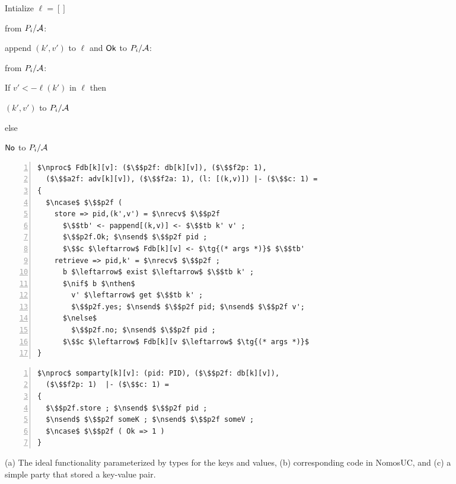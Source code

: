 \begin{figure}
\centering
\begin{minipage}{0.38\textwidth}
\begin{bbox}[title={Functionality $\F_{\m{db}}$}]

Intialize $\ell = []$

\OnInput {} from $P_i/\mathcal{A}$:

\qquad append $(k',v')$ to $\ell$ and \Send $\mathsf{Ok}$ to $P_i/\mathcal{A}$:

\OnInput {} from $P_i/\mathcal{A}$:

\qquad If $v' <- \ell(k')$ in $\ell$ then

\qquad \qquad \Send $(k', v')$ to $P_i/\mathcal{A}$

\qquad else

\qquad \qquad \Send $\mathsf{No}$ to $P_i/\mathcal{A}$
\end{bbox}
\end{minipage}
\hspace{3em}
\begin{minipage}{0.5\textwidth}
\begin{lstlisting}[basicstyle=\scriptsize\BeraMonottFamily, frame=single, mathescape, numbers=left, xleftmargin=2em, xrightmargin=2em]
$\nproc$ Fdb[k][v]: ($\$$p2f: db[k][v]), ($\$$f2p: 1), 
  ($\$$a2f: adv[k][v]), ($\$$f2a: 1), (l: [(k,v)]) |- ($\$$c: 1) =
{
  $\ncase$ $\$$p2f (
    store => pid,(k',v') = $\nrecv$ $\$$p2f
      $\$$tb' <- pappend[(k,v)] <- $\$$tb k' v' ;
      $\$$p2f.Ok; $\nsend$ $\$$p2f pid ;
	  $\$$c $\leftarrow$ Fdb[k][v] <- $\tg{(* args *)}$ $\$$tb'
    retrieve => pid,k' = $\nrecv$ $\$$p2f ;
      b $\leftarrow$ exist $\leftarrow$ $\$$tb k' ;
      $\nif$ b $\nthen$
        v' $\leftarrow$ get $\$$tb k' ;
        $\$$p2f.yes; $\nsend$ $\$$p2f pid; $\nsend$ $\$$p2f v';
      $\nelse$
        $\$$p2f.no; $\nsend$ $\$$p2f pid ;
      $\$$c $\leftarrow$ Fdb[k][v $\leftarrow$ $\tg{(* args *)}$ 
}
\end{lstlisting}
\end{minipage}
\hspace{3em}
\begin{minipage}{0.5\textwidth}
\begin{lstlisting}[basicstyle=\scriptsize\BeraMonottFamily, frame=single, mathescape, numbers=left, xleftmargin=2em, xrightmargin=2em]
$\nproc$ somparty[k][v]: (pid: PID), ($\$$p2f: db[k][v]), 
  ($\$$f2p: 1)  |- ($\$$c: 1) =
{
  $\$$p2f.store ; $\nsend$ $\$$p2f pid ; 
  $\nsend$ $\$$p2f someK ; $\nsend$ $\$$p2f someV ;
  $\ncase$ $\$$p2f ( Ok => 1 )
}
\end{lstlisting}
\end{minipage}
\caption{(a) The ideal functionality \Fdb parameterized by types for the keys and values, 
(b) corresponding code in NomosUC, and (c) a simple party that stored a key-value pair.}
\label{fig:fdbideal}
\vspace{-4mm}
\end{figure}
